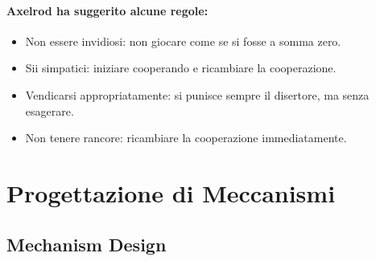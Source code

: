 
\paragraph{Axelrod ha suggerito alcune regole:}

\begin{itemize}
  \item Non essere invidiosi: non giocare come se si fosse a somma zero. 
  \item Sii simpatici: iniziare cooperando e ricambiare la cooperazione. 
  \item Vendicarsi appropriatamente: si punisce sempre il disertore, ma senza esagerare. 
  \item Non tenere rancore: ricambiare la cooperazione immediatamente.
\end{itemize}

\section{Progettazione di Meccanismi}

\subsection{Mechanism Design}








